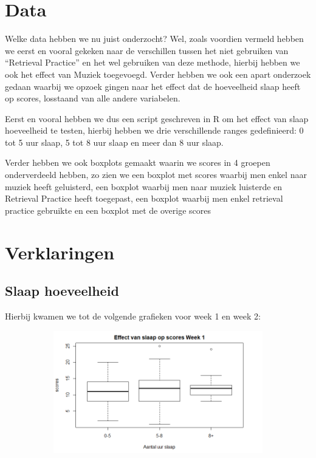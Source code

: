 \documentclass{hogent-article}
\begin{document}
\section{Data}

Welke data hebben we nu juist onderzocht? Wel, zoals voordien vermeld hebben we eerst en vooral gekeken naar de verschillen tussen het niet gebruiken van “Retrieval Practice” en het wel gebruiken van deze methode, hierbij hebben we ook het effect van Muziek toegevoegd. Verder hebben we ook een apart onderzoek gedaan waarbij we opzoek gingen naar het effect dat de hoeveelheid slaap heeft op scores, losstaand van alle andere variabelen.\\
\par
\noindent
Eerst en vooral hebben we dus een script geschreven in R om het effect van slaap hoeveelheid te testen, hierbij hebben we drie verschillende ranges gedefinieerd: 0 tot 5 uur slaap, 5 tot 8 uur slaap en meer dan 8 uur slaap.\\
\par
\noindent
Verder hebben we ook boxplots gemaakt waarin we scores in 4 groepen onderverdeeld hebben, zo zien we een boxplot met scores waarbij men enkel naar muziek heeft geluisterd, een boxplot waarbij men naar muziek luisterde en Retrieval Practice heeft toegepast, een boxplot waarbij men enkel retrieval practice gebruikte en een boxplot met de overige scores
\section{Verklaringen}

\subsection{Slaap hoeveelheid}

Hierbij kwamen we tot de volgende grafieken voor week 1 en week 2:

\begin{figure}[H]
	\begin{subfigure}{0.45\textwidth}
		\includegraphics[width=\linewidth]{slaapGraph1}
	\end{subfigure}
\end{figure}
\end{document}
